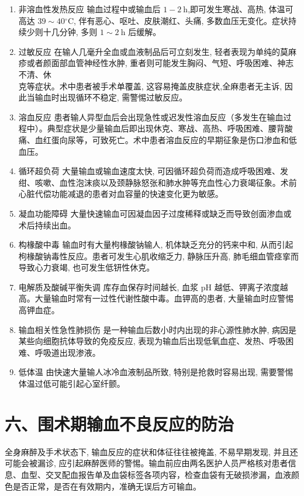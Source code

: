 \documentclass[10pt]{article}
\begin{document}
\begin{enumerate}
  \item 非溶血性发热反应 输血过程中或输血后 $1-2 \mathrm{~h}$,即可发生寒战、高热, 体温可高达 $39 \sim 40{ }^{\circ} \mathrm{C}$, 伴有恶心、呕吐、皮肤潮红、头痛, 多数血压无变化。症状持续少则十几分钟, 多则 $1 \sim 2 \mathrm{~h}$ 后缓解。

  \item 过敏反应 在输人几毫升全血或血液制品后可立刻发生, 轻者表现为单纯的莫麻疹或者颜面部血管神经性水肿, 重者则可能发生胸闷、气短、呼吸困难、神志不清、休\\
克等症状。术中患者被手术单覆盖, 这容易掩盖皮肤症状,全麻患者无主诉, 因此当输血时出现循环不稳定, 需警惕过敏反应。

  \item 溶血反应 患者输人异型血后会出现急性或迟发性溶血反应（多发生在输血过程中）。典型症状是少量输血后即出现休克、寒战、高热、呼吸困难、腰背酸痛、血红蛋向尿等，可致死亡。术中患者溶血反应的早期征象是伤口渗血和低血压。

  \item 循环超负荷 大量输血或输血速度太快, 可因循环超负荷而造成呼吸困难、发绀、咳嗽、血性泡沫痰以及颈静脉怒张和肺水肿等充血性心力衰竭征象。术前心脏代偿功能减退的患者对血容量的快速变化更为敏感。

  \item 凝血功能障碍 大量快速输血可因凝血因子过度稀释或缺乏而导致创面渗血或术后持续出血。

  \item 构椽酸中毒 输血时有大量枸椽酸钠输人, 机体缺乏充分的钙来中和, 从而引起枸椽酸钠毒性反应。患者可发生心肌收缩乏力, 静脉压升高, 肺毛细血管痉挛而导致心力衰竭, 也可发生低钘性休克。

  \item 电解质及酸碱平衡失调 库存血保存时间越长, 血浆 $\mathrm{pH}$ 越低、钾离子浓度越高。大量输血时常有一过性代谢性酸中毒。血钾高的患者, 大量输血时应警惕高钾血症。

  \item 输血相关性急性肺损伤 是一种输血后数小时内出现的非心源性肺水肿, 病因是某些向细胞抗体导致的免疫反应, 表现为输血后出现低氧血症、发热、呼吸困难、呼吸道出现渗液。

  \item 低体温 由快速大量输人冰冷血液制品所致, 特别是抢救时容易出现, 需要警惕体温过低可能引起心室纤颤。

\end{enumerate}

\section*{六、围术期输血不良反应的防治}
全身麻醉及手术状态下, 输血反应的症状和体征往往被掩盖, 不易早期发现, 并且还可能会被漏诊, 应引起麻醉医师的警惕。输血前应由两名医护人员严格核对患者信息、血型、交叉配血报告单及血袋标签各项内容，检查血袋有无破损渗漏，血液颜色是否正常，是否在有效期内，准确无误后方可输血。
\end{document}
